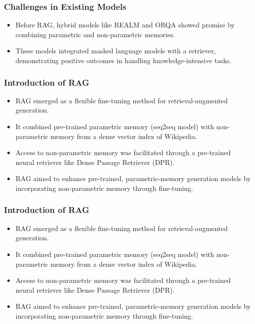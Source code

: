\begin{frame}[fragile]\frametitle{Challenges in Existing Models}
  \begin{itemize}
    \item Before RAG, hybrid models like REALM and ORQA showed promise by combining parametric and non-parametric memories.
    \item These models integrated masked language models with a retriever, demonstrating positive outcomes in handling knowledge-intensive tasks.
  \end{itemize}
\end{frame}

\begin{frame}[fragile]\frametitle{Introduction of RAG}
  \begin{itemize}
    \item RAG emerged as a flexible fine-tuning method for retrieval-augmented generation.
    \item It combined pre-trained parametric memory (seq2seq model) with non-parametric memory from a dense vector index of Wikipedia.
    \item Access to non-parametric memory was facilitated through a pre-trained neural retriever like Dense Passage Retriever (DPR).
    \item RAG aimed to enhance pre-trained, parametric-memory generation models by incorporating non-parametric memory through fine-tuning.
  \end{itemize}
\end{frame}


\begin{frame}[fragile]\frametitle{Introduction of RAG}
  \begin{itemize}
    \item RAG emerged as a flexible fine-tuning method for retrieval-augmented generation.
    \item It combined pre-trained parametric memory (seq2seq model) with non-parametric memory from a dense vector index of Wikipedia.
    \item Access to non-parametric memory was facilitated through a pre-trained neural retriever like Dense Passage Retriever (DPR).
    \item RAG aimed to enhance pre-trained, parametric-memory generation models by incorporating non-parametric memory through fine-tuning.
  \end{itemize}
\end{frame}

